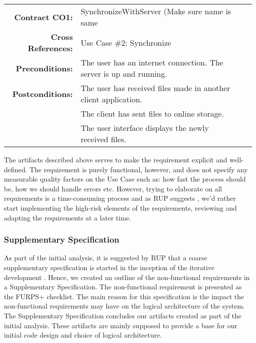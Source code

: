 \begin{table*}[ht]\centering
  \begin{tabularx}{\textwidth}{@{}rXXl@{}}\toprule
    \textbf{Contract CO1:} & SynchronizeWithServer (Make sure name is same\\
    \textbf{Cross References:} & Use Case \#2: Synchronize\\
    \textbf{Preconditions:} &  The user has an internet connection. The server is up and running.\\
    \textbf{Postconditions:} & The user has received files made in another client application.\\
    & The client has sent files to online storage.\\
    & The user interface displays the newly received files.\\
    \bottomrule
  \end{tabularx}
\end{table*}

The artifacts described above serves to make the requirement explicit and well-defined. The requirement is purely functional, however, and does not specify any measurable quality factors on the Use Case such as: how fast the process should be, how we should handle errors etc. However, trying to elaborate on all requirements is a time-consuming process and as RUP suggests \cite[12.2 p.~196]{OOAD}, we’d rather start implementing the high-risk elements of the requirements, reviewing and adapting the requirements at a later time. \\
\subsubsection{Supplementary Specification}
As part of the initial analysis, it is suggested by RUP that a coarse supplementary specification is started in the inception of the iterative development \cite[7.1 p.~102]{OOAD}. Hence, we created an outline of the non-functional requirements in a Supplementary Specification. The non-functional requirement is presented as the FURPS+ checklist. The main reason for this specification is the impact the non-functional requirements may have on the logical architecture of the system.\\
\newline
The Supplementary Specification concludes our artifacts created as part of the initial analysis. These artifacts are mainly supposed to provide a base for our initial code design and choice of logical architecture.\\